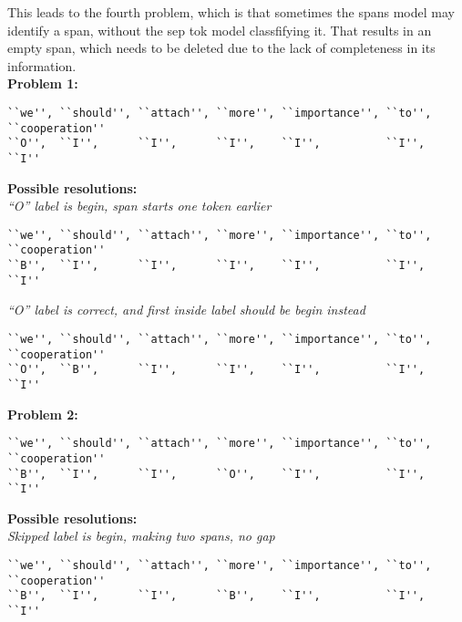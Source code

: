 \documentclass[12]{article}
\theoremstyle{mytheoremstyle}
\theoremstyle{mytheoremstyle}
\theoremstyle{myproblemstyle}
\begin{document}
  This leads to the fourth problem, which is that sometimes the spans model may identify a span, without the sep tok model classfifying it. 
  That results in an empty span, which needs to be deleted due to the lack of completeness in its information.
  \vspace{2ex} \\
  \textbf{Problem 1:}
  \vspace{-1.5ex}
  \begin{verbatim}
``we'', ``should'', ``attach'', ``more'', ``importance'', ``to'', ``cooperation''
``O'',  ``I'',      ``I'',      ``I'',    ``I'',          ``I'',  ``I''
  \end{verbatim}
  \vspace{-4ex}
  \textbf{Possible resolutions:}\\
  \textit{``O'' label is begin, span starts one token earlier}
  \vspace{-1.5ex}
  \begin{verbatim}
``we'', ``should'', ``attach'', ``more'', ``importance'', ``to'', ``cooperation''
``B'',  ``I'',      ``I'',      ``I'',    ``I'',          ``I'',  ``I''
  \end{verbatim}
  \vspace{-4ex}
  \textit{``O'' label is correct, and first inside label should be begin instead}
  \vspace{-1.5ex}
  \begin{verbatim}
``we'', ``should'', ``attach'', ``more'', ``importance'', ``to'', ``cooperation''
``O'',  ``B'',      ``I'',      ``I'',    ``I'',          ``I'',  ``I''
  \end{verbatim}
  \vspace{-2ex}
  \textbf{Problem 2:}
  \vspace{-1.5ex}
  \begin{verbatim}
``we'', ``should'', ``attach'', ``more'', ``importance'', ``to'', ``cooperation''
``B'',  ``I'',      ``I'',      ``O'',    ``I'',          ``I'',  ``I''
  \end{verbatim}
  \vspace{-4ex}
  \textbf{Possible resolutions:}\\
  \textit{Skipped label is begin, making two spans, no gap}
  \vspace{-1.5ex}
  \begin{verbatim}
``we'', ``should'', ``attach'', ``more'', ``importance'', ``to'', ``cooperation''
``B'',  ``I'',      ``I'',      ``B'',    ``I'',          ``I'',  ``I''
  \end{verbatim}
\end{document}
